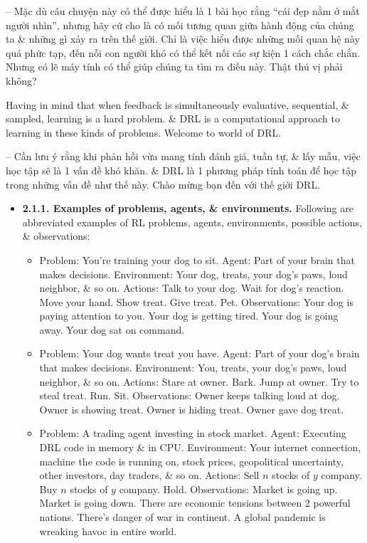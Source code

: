 \documentclass{article}
\begin{document}
\begin{itemize}
\begin{itemize}
        -- Mặc dù câu chuyện này có thể được hiểu là 1 bài học rằng ``cái đẹp nằm ở mắt người nhìn'', nhưng hãy cứ cho là có mối tương quan giữa hành động của chúng ta \& những gì xảy ra trên thế giới. Chỉ là việc hiểu được những mối quan hệ này quá phức tạp, đến nỗi con người khó có thể kết nối các sự kiện 1 cách chắc chắn. Nhưng có lẽ máy tính có thể giúp chúng ta tìm ra điều này. Thật thú vị phải không?

        Having in mind that when feedback is simultaneously evaluative, sequential, \& sampled, learning is a hard problem. \& DRL is a computational approach to learning in these kinds of problems. Welcome to world of DRL.

        -- Cần lưu ý rằng khi phản hồi vừa mang tính đánh giá, tuần tự, \& lấy mẫu, việc học tập sẽ là 1 vấn đề khó khăn. \& DRL là 1 phương pháp tính toán để học tập trong những vấn đề như thế này. Chào mừng bạn đến với thế giới DRL.
        \begin{itemize}
            \item {\bf2.1.1. Examples of problems, agents, \& environments.} Following are abbreviated examples of RL problems, agents, environments, possible actions, \& observations:
            \begin{itemize}
                \item Problem: You're training your dog to sit. Agent: Part of your brain that makes decisions. Environment: Your dog, treats, your dog's paws, loud neighbor, \& so on. Actions: Talk to your dog. Wait for dog's reaction. Move your hand. Show treat. Give treat. Pet. Observations: Your dog is paying attention to you. Your dog is getting tired. Your dog is going away. Your dog sat on command.
                \item Problem: Your dog wants treat you have. Agent: Part of your dog's brain that makes decisions. Environment: You, treats, your dog's paws, loud neighbor, \& so on. Actions: Stare at owner. Bark. Jump at owner. Try to steal treat. Run. Sit. Observations: Owner keeps talking loud at dog. Owner is showing treat. Owner is hiding treat. Owner gave dog treat.
                \item Problem: A trading agent investing in stock market. Agent: Executing DRL code in memory \& in CPU. Environment: Your internet connection, machine the code is running on, stock prices, geopolitical uncertainty, other investors, day traders, \& so on. Actions: Sell $n$ stocks of $y$ company. Buy $n$ stocks of $y$ company. Hold. Observations: Market is going up. Market is going down. There are economic tensions between 2 powerful nations. There's danger of war in continent. A global pandemic is wreaking havoc in entire world.

\end{itemize}
\end{itemize}
\end{itemize}
\end{itemize}
\end{document}
